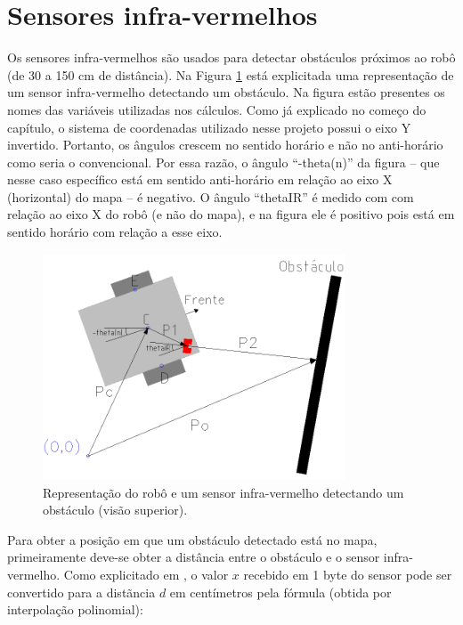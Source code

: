 \section{Sensores infra-vermelhos}

Os sensores infra-vermelhos são usados para detectar obstáculos próximos ao robô (de 30 a 150 cm de distância). Na Figura \ref{fig:robo_ir} está explicitada uma representação de um sensor infra-vermelho detectando um obstáculo. Na figura estão presentes os nomes das variáveis utilizadas nos cálculos. Como já explicado no começo do capítulo, o sistema de coordenadas utilizado nesse projeto possui o eixo Y invertido. Portanto, os ângulos crescem no sentido horário e não no anti-horário como seria o convencional. Por essa razão, o ângulo ``-theta(n)'' da figura -- que nesse caso específico está em sentido anti-horário em relação ao eixo X (horizontal) do mapa -- é negativo. O ângulo ``thetaIR'' é medido com com relação ao eixo X do robô (e não do mapa), e na figura ele é positivo pois está em sentido horário com relação a esse eixo.

\begin{figure}[H]
  \centering
  \includegraphics[width=0.8\textwidth, keepaspectratio]{./figuras/robo/robo_ir.png}
  \caption{Representação do robô e um sensor infra-vermelho detectando um obstáculo (visão superior).}
  \label{fig:robo_ir}
\end{figure}

Para obter a posição em que um obstáculo detectado está no mapa, primeiramente deve-se obter a distância entre o obstáculo e o sensor infra-vermelho. Como explicitado em \cite{bellator_2012}, o valor $x$ recebido em 1 byte do sensor pode ser convertido para a distãncia $d$ em centímetros pela fórmula (obtida por interpolação polinomial):

